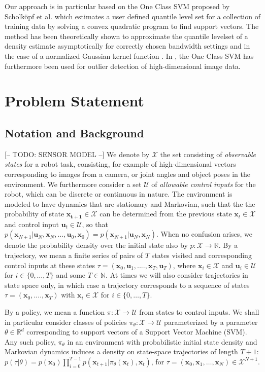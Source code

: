 \documentclass[10pt, conference]{ieeeconf}      %
\newcommand{\bu}{\mathbf{u}}
\newcommand{\bx}{\mathbf{x}}
\begin{document}
Our approach is in particular based on the One Class SVM proposed by Scholk{\"o}pf et al. which estimates a user
defined quantile level set for a collection of training data by solving a convex quadratic program  to find support
vectors. The method has been theoretically shown to approximate the quantile levelset of a density estimate
asymptotically for correctly chosen bandwidth settings and in the case of a normalized Gaussian kernel function \cite{vert2006consistency}. 
In \cite{liu2014unsupervised}, the One Class SVM has furthermore been used for outlier detection of high-dimensional 
image data.

\section{Problem Statement}
\subsection{Notation and Background}
{\color{blue} [-- TODO: SENSOR MODEL --]}
We denote by $\mathcal{X}$ the set consisting of \emph{observable states} for a robot task, consisting, for example of
high-dimensional vectors corresponding to images from a camera, or joint angles and object poses in the environment.
We furthermore consider a set $\mathcal{U}$ of \emph{allowable control inputs} for the robot, which can be discrete or continuous in
nature. The environment is
modeled to have dynamics that are stationary and Markovian, such that the the probability of state $\mathbf{x_{t+1}}\in
\mathcal{X}$ can be determined from the previous state $\mathbf{x}_t\in\mathcal{X}$ and control input $\mathbf{u}_t\in \mathcal{U}$,
so that $p(\bx_{N+1}|\bu_{N},\bx_{N}, \ldots, \bu_{0}, \bx_{0})=p(\bx_{N+1}|\bu_{N}, \bx_N)$.  
When no confusion arises, we denote the probability density over the initial state also by $p:\mathcal{X}\to
\mathbb{R}$. By a trajectory, we mean a finite series of pairs of $T$ states visited and corresponding
control inputs at these states $\tau = (\mathbf{x}_0,\mathbf{u}_1, ...., \mathbf{x}_T,\mathbf{u}_T)$, where $\bx_i\in \mathcal{X}$
and $\bu_i\in \mathcal{U}$ for $i\in \{0, \ldots, T\}$ and some $T\in \mathbb{N}$.  
At times we will also consider trajectories in state space only, in which case a trajectory corresponds
to a sequence of states $\tau = (\bx_0,....,\bx_T)$ with $\bx_i\in\mathcal{X}$ for $i\in \{0, \ldots, T\}$.


By a policy, we mean a function $\pi: \mathcal{X} \to \mathcal{U}$ from states to control inputs. 
We shall in particular consider classes of policies $\pi_{\theta}:\mathcal{X}\to \mathcal{U}$ parameterized by a
parameter $\theta\in \mathbb{R}^d$ corresponding to support vectors of a Support Vector Machine (SVM).
Any such policy, $\pi_{\theta}$ in an environment with probabilistic initial state density and Markovian dynamics
induces a density on state-space trajectories of length $T+1$: $p(\tau | \theta)=
p(\bx_0)\prod_{i=0}^{T-1}p(\bx_{t+1}|\pi_{\theta}(\bx_t),\bx_t)$, for $\tau = (\bx_0, \bx_1, \ldots, \bx_N)\in
\mathcal{X}^{N+1}$.
\end{document}

